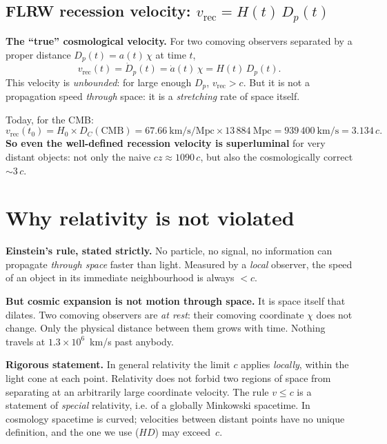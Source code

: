 \documentclass[11pt,a4paper,openany]{report}
\newcommand{\Mpc}{\text{Mpc}}
\newcommand{\Hzero}{H_{0}}
\begin{document}
\subsection{FLRW recession velocity: $v_{\text{rec}} = H(t)\,D_p(t)$}

\begin{tcolorbox}[undergrad]
\textbf{The “true” cosmological velocity.} For two comoving observers
separated by a proper distance $D_p(t) = a(t)\,\chi$ at time $t$,
\[
v_{\text{rec}}(t) = \dot D_p(t) = \dot a(t)\,\chi = H(t)\,D_p(t).
\]
This velocity is \emph{unbounded}: for large enough $D_p$, $v_{\text{rec}} > c$.
But it is not a propagation speed \emph{through} space: it is a
\emph{stretching} rate of space itself.
\end{tcolorbox}

Today, for the CMB:
\[
v_{\text{rec}}(t_0) = \Hzero \times D_C(\text{CMB})
   = 67.66~\text{km/s/Mpc} \times 13\,884~\Mpc
   = 939\,400~\text{km/s} = 3.134\,c.
\]
\textbf{So even the well-defined recession velocity is superluminal} for very
distant objects: not only the naive $cz \approx 1090\,c$, but also the
cosmologically correct $\sim 3\,c$.

\section{Why relativity is not violated}

\begin{tcolorbox}[plain]
\textbf{Einstein's rule, stated strictly.} No particle, no signal, no
information can propagate \emph{through space} faster than light. Measured by a
\emph{local} observer, the speed of an object in its immediate neighbourhood is
always $<c$.

\medskip
\textbf{But cosmic expansion is not motion through space.} It is space itself
that dilates. Two comoving observers are \emph{at rest}: their comoving
coordinate $\chi$ does not change. Only the physical distance between them
grows with time. Nothing travels at $1.3\times 10^{6}$~km/s past anybody.
\end{tcolorbox}

\begin{tcolorbox}[undergrad]
\textbf{Rigorous statement.} In general relativity the limit $c$ applies
\emph{locally}, within the light cone at each point. Relativity does not forbid
two regions of space from separating at an arbitrarily large coordinate
velocity. The rule $v\le c$ is a statement of \emph{special} relativity, i.e.
of a globally Minkowski spacetime. In cosmology spacetime is curved; velocities
between distant points have no unique definition, and the one we use ($H D$) may
exceed~$c$.
\end{tcolorbox}
\end{document}
